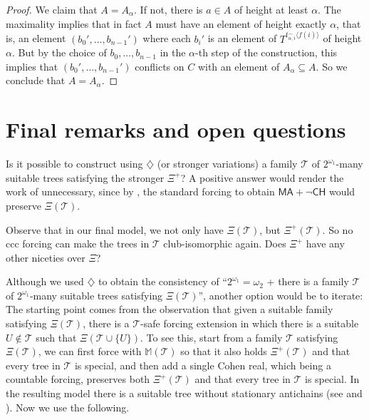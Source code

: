 \documentclass[a4paper,noamsfonts]{amsart}
\theoremstyle{definition}
\newcommand{\seb}{\subseteq}
\newcommand{\tup}[1]{\langle#1\rangle}
\newcommand{\CH}{\textsf{CH}}
\newcommand{\MA}{\textsf{MA}}
\newcommand{\1}{\mathbbm{1}}
\newcommand{\dia}{\diamondsuit}
\newcommand{\M}{\mathbb{M}}
\newcommand{\T}{\mathcal{T}}
\newcommand{\prop}{\Xi}
\newcommand{\propp}{\prop^{+}}
\begin{document}
\begin{proof}
  We claim that $A = A_{\alpha}$. If not, there is $a \in A$ of
  height at least $\alpha$. The maximality implies that in fact
  $A$ must have an element of height exactly $\alpha$,
  that is, an element $(b_{0}',\dots,b_{n-1}')$ where
  each $b_{i}'$ is an element of $T^{t_{\alpha,i}^{\frown}\tup{f(i)}}$
  of height $\alpha$. But 
  by the choice of $b_{0},\dots,b_{n-1}$ in
  the $\alpha$-th step of the construction, this implies that
  $(b_{0}',\dots,b_{n-1}')$ conflicts on $C$
  with an element of $A_{\alpha} \seb A$.
  So we conclude that $A = A_{\alpha}$.
\end{proof}

\section{Final remarks and open questions}

Is it possible to construct using $\dia$ (or stronger variations) a family
$\T$ of $2^{\omega_{1}}$-many suitable trees satisfying the stronger $\propp$?
A positive answer would render the work of 
unnecessary, since by , the standard forcing
to obtain $\MA + \neg \CH$ would preserve $\prop(\T)$.

Observe that in our final model, we not only have $\prop(\T)$, but
$\propp(\T)$. So no ccc forcing can make the trees in $\T$
club-isomorphic again. Does $\propp$ have any other niceties over $\prop$?

Although we used $\dia$ to obtain the consistency of
``$2^{\omega_{1}} = \omega_{2}$
+ there is a family $\T$ of $2^{\omega_{1}}$-many suitable trees
satisfying $\prop(\T)$'', another option would be to iterate: The
starting point comes from the observation that given a suitable family satisfying
$\prop(\T)$, there is a $\T$-safe forcing extension in which there
is a suitable $U \notin \T$ such that $\prop(\T \cup \{U\})$. To see this,
start from a family $\T$ satisfying $\prop(\T)$,
we can first force with $\M(\T)$ so that it also holds $\propp(\T)$ and
that every
tree in $\T$ is special, and then add a single Cohen real, which
being a countable forcing, preserves both $\propp(\T)$ and that every
tree in $\T$ is special. In the resulting
model there is a suitable tree without stationary antichains
(see \cite{TodorcevicWalks}
and \cite{HrusakMartinez}). Now we use the following.
 
\end{document}
